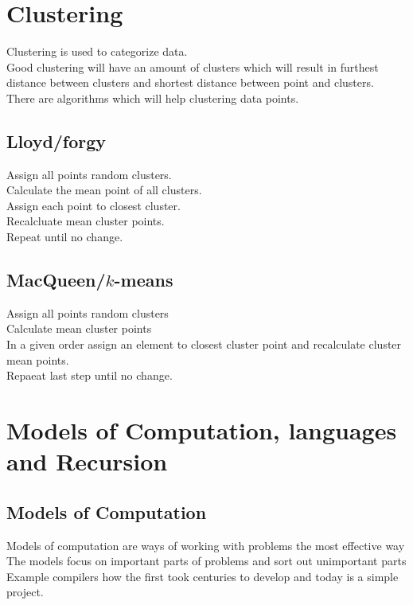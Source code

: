 \documentclass[12pt, a4paper]{article}
\begin{document}
		\section{Clustering}
			Clustering is used to categorize data.\\
			Good clustering will have an amount of clusters which will result in furthest distance between clusters and shortest distance between point and clusters.\\
			There are algorithms which will help clustering data points.\\
			\subsection{Lloyd/forgy}
				Assign all points random clusters.\\
				Calculate the mean point of all clusters.\\
				Assign each point to closest cluster.\\
				Recalcluate mean cluster points.\\
				Repeat until no change.\\
			\subsection{MacQueen/$k$-means}
				Assign all points random clusters\\
				Calculate mean cluster points\\
				In a given order assign an element to closest cluster point and recalculate cluster mean points.\\
				Repaeat last step until no change.
		\section{Models of Computation, languages and Recursion}
			\subsection{Models of Computation}
				Models of computation are ways of working with problems the most effective way\\
				The models focus on important parts of problems and sort out unimportant parts\\
				Example compilers how the first took centuries to develop and today is a simple project.
\end{document}
